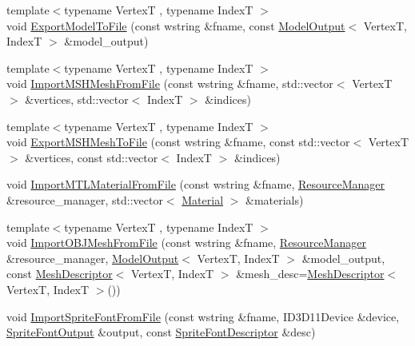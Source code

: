 \begin{DoxyCompactItemize}
\item 
{\footnotesize template$<$typename VertexT , typename IndexT $>$ }\\void \hyperlink{namespacemage_1_1rendering_1_1loader_a18435eacbabdd539a8d655814884c33e}{Export\+Model\+To\+File} (const wstring \&fname, const \hyperlink{structmage_1_1rendering_1_1_model_output}{Model\+Output}$<$ VertexT, IndexT $>$ \&model\+\_\+output)
\item 
{\footnotesize template$<$typename VertexT , typename IndexT $>$ }\\void \hyperlink{namespacemage_1_1rendering_1_1loader_a433f105d376ae72e6fb53f73fe1eebf5}{Import\+M\+S\+H\+Mesh\+From\+File} (const wstring \&fname, std\+::vector$<$ VertexT $>$ \&vertices, std\+::vector$<$ IndexT $>$ \&indices)
\item 
{\footnotesize template$<$typename VertexT , typename IndexT $>$ }\\void \hyperlink{namespacemage_1_1rendering_1_1loader_a00d446d12dbc214ddbc0cfbdd0bf11c1}{Export\+M\+S\+H\+Mesh\+To\+File} (const wstring \&fname, const std\+::vector$<$ VertexT $>$ \&vertices, const std\+::vector$<$ IndexT $>$ \&indices)
\item 
void \hyperlink{namespacemage_1_1rendering_1_1loader_afd6e9ecbef2e78d852bbce19a023b723}{Import\+M\+T\+L\+Material\+From\+File} (const wstring \&fname, \hyperlink{classmage_1_1rendering_1_1_resource_manager}{Resource\+Manager} \&resource\+\_\+manager, std\+::vector$<$ \hyperlink{classmage_1_1rendering_1_1_material}{Material} $>$ \&materials)
\item 
{\footnotesize template$<$typename VertexT , typename IndexT $>$ }\\void \hyperlink{namespacemage_1_1rendering_1_1loader_a425df3f01d6fb2100000ab8be861e3a3}{Import\+O\+B\+J\+Mesh\+From\+File} (const wstring \&fname, \hyperlink{classmage_1_1rendering_1_1_resource_manager}{Resource\+Manager} \&resource\+\_\+manager, \hyperlink{structmage_1_1rendering_1_1_model_output}{Model\+Output}$<$ VertexT, IndexT $>$ \&model\+\_\+output, const \hyperlink{classmage_1_1rendering_1_1_mesh_descriptor}{Mesh\+Descriptor}$<$ VertexT, IndexT $>$ \&mesh\+\_\+desc=\hyperlink{classmage_1_1rendering_1_1_mesh_descriptor}{Mesh\+Descriptor}$<$ VertexT, IndexT $>$())
\item 
void \hyperlink{namespacemage_1_1rendering_1_1loader_a9c766b1f4a10e9dced787087ec67bb2c}{Import\+Sprite\+Font\+From\+File} (const wstring \&fname, I\+D3\+D11\+Device \&device, \hyperlink{structmage_1_1rendering_1_1_sprite_font_output}{Sprite\+Font\+Output} \&output, const \hyperlink{classmage_1_1rendering_1_1_sprite_font_descriptor}{Sprite\+Font\+Descriptor} \&desc)

\end{DoxyCompactItemize}

